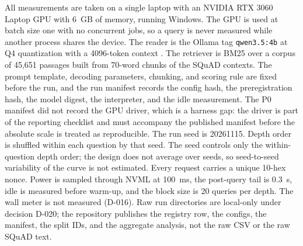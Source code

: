 \documentclass[a4paper,fleqn]{cas-sc}
\begin{document}
All measurements are taken on a single laptop with an NVIDIA RTX 3060 Laptop GPU with 6~GB of memory, running Windows. The GPU is used at batch size one with no concurrent jobs, so a query is never measured while another process shares the device. The reader is the Ollama tag \texttt{qwen3.5:4b} at Q4 quantization with a 4096-token context \cite{ollama}. The retriever is BM25 \cite{robertson2009bm25} over a corpus of 45{,}651 passages built from 70-word chunks of the SQuAD contexts. The prompt template, decoding parameters, chunking, and scoring rule are fixed before the run, and the run manifest records the config hash, the preregistration hash, the model digest, the interpreter, and the idle measurement. The P0 manifest did not record the GPU driver, which is a harness gap: the driver is part of the reporting checklist and must accompany the published manifest before the absolute scale is treated as reproducible. The run seed is 20261115. Depth order is shuffled within each question by that seed. The seed controls only the within-question depth order; the design does not average over seeds, so seed-to-seed variability of the curve is not estimated. Every request carries a unique 10-hex nonce. Power is sampled through NVML at 100~ms, the post-query tail is 0.3~s, idle is measured before warm-up, and the block size is 20 queries per depth. The wall meter is not measured (D-016). Raw run directories are local-only under decision D-020; the repository publishes the registry row, the configs, the manifest, the split IDs, and the aggregate analysis, not the raw CSV or the raw SQuAD text.
\end{document}
